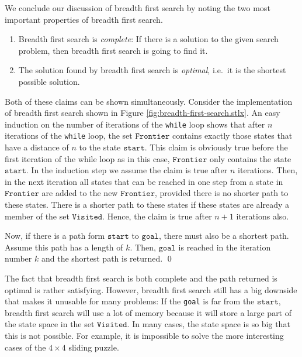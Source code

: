 We conclude our discussion of breadth first search by noting the two most important properties of
breadth first search.
\begin{enumerate}
\item Breadth first search is \emph{\color{blue}complete}:  If there is a solution to the given
      search problem, then breadth first search is going to find it.
\item The solution found by breadth first search is \emph{\color{blue}optimal}, i.e.~it is the
      shortest possible solution.
\end{enumerate}
\proof
Both of these claims can be shown simultaneously.  Consider the implementation of breadth first
search shown in Figure \ref{fig:breadth-first-search.stlx}.  An easy induction on the number of
iterations of the \texttt{while} loop shows that after $n$ iterations of the \texttt{while} loop,
the set $\mathtt{Frontier}$ contains exactly those states that have a distance of $n$ to the state 
$\mathtt{start}$.  This claim is obviously true before the first iteration of the while loop as in
this case, $\mathtt{Frontier}$ only contains the state $\mathtt{start}$.  In the induction step we
assume the claim is true after $n$ iterations.  Then, in the next iteration all states that can be
reached in one step from a state in $\mathtt{Frontier}$ are added to the new $\mathtt{Frontier}$,
provided there is no shorter path to these states.  There is a shorter path to these states if these
states are already a member of the set $\mathtt{Visited}$.  Hence, the claim is true after $n+1$
iterations also.

Now, if there is a path form $\mathtt{start}$ to $\mathtt{goal}$, there must also be a shortest
path.  Assume this path has a length of $k$.  Then, $\mathtt{goal}$ is reached in the iteration
number $k$ and the shortest path is returned.
\qed

The fact that breadth first search is both complete and the path returned is optimal is rather
satisfying.  However, breadth first search still has a big downside that makes it unusable for
many problems:  If the \texttt{goal} is far from the $\mathtt{start}$, breadth first search will use
a lot of memory because it will store a large part of the state space in the set
$\mathtt{Visited}$.  In many cases, the state space is so big that this is not possible.  For example, it is
impossible to solve the more interesting cases of the $4 \times 4$ sliding puzzle.
\pagebreak


